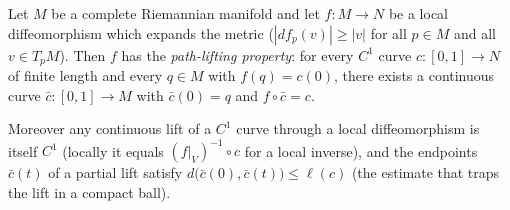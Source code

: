 \begin{lemma}
  \label{lem:dc-ch7-3-3-path-lifting}
  \leanok
  Let $M$ be a complete Riemannian manifold and let $f:M\to N$ be a local
  diffeomorphism which expands the metric ($|df_p(v)|\ge|v|$ for all $p\in M$ and
  all $v\in T_pM$). Then $f$ has the \emph{path-lifting property}: for every
  $C^1$ curve $c:[0,1]\to N$ of finite length and every $q\in M$ with $f(q)=c(0)$,
  there exists a continuous curve $\bar c:[0,1]\to M$ with $\bar c(0)=q$ and
  $f\circ\bar c=c$.

  Moreover any continuous lift of a $C^1$ curve through a local diffeomorphism is
  itself $C^1$ (locally it equals $(f|_V)^{-1}\circ c$ for a local inverse), and
  the endpoints $\bar c(t)$ of a partial lift satisfy
  $d\big(\bar c(0),\bar c(t)\big)\le\ell(c)$ (the estimate that traps the lift in a
  compact ball).
\end{lemma}
